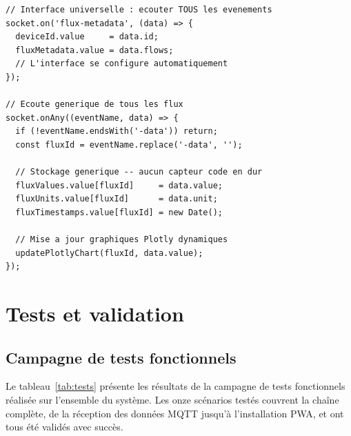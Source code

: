 \documentclass[12pt, a4paper]{report}
\begin{document}
\begin{lstlisting}[caption={\'Ecoute universelle de tous les flux IoT
                   via socket.onAny()}, label={lst:ecoute}]
// Interface universelle : ecouter TOUS les evenements
socket.on('flux-metadata', (data) => {
  deviceId.value     = data.id;
  fluxMetadata.value = data.flows;
  // L'interface se configure automatiquement
});

// Ecoute generique de tous les flux
socket.onAny((eventName, data) => {
  if (!eventName.endsWith('-data')) return;
  const fluxId = eventName.replace('-data', '');

  // Stockage generique -- aucun capteur code en dur
  fluxValues.value[fluxId]     = data.value;
  fluxUnits.value[fluxId]      = data.unit;
  fluxTimestamps.value[fluxId] = new Date();

  // Mise a jour graphiques Plotly dynamiques
  updatePlotlyChart(fluxId, data.value);
});
\end{lstlisting}

\chapter{Tests et validation}

\section{Campagne de tests fonctionnels}

Le tableau~\ref{tab:tests} pr\'esente les r\'esultats de la campagne
de tests fonctionnels r\'ealis\'ee sur l'ensemble du syst\`eme. Les
onze sc\'enarios test\'es couvrent la cha\^ine compl\`ete, de la
r\'eception des donn\'ees MQTT jusqu'\`a l'installation PWA, et ont
tous \'et\'e valid\'es avec succ\`es.
\end{document}
